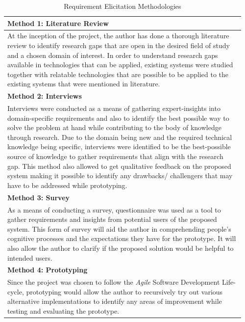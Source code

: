\begin{longtable}{|p{0.96\linewidth}|}
\caption{Requirement Elicitation Methodologies}\\
\hline
\textbf{Method 1: Literature Review} \\
\hline
At the inception of the project, the author has done a thorough literature review to identify research gaps that are open in the desired field of study and a chosen domain of interest. In order to understand research gaps available in technologies that can be applied, existing systems were studied together with relatable technologies that are possible to be applied to the existing systems that were mentioned in literature. \\
\hline
\textbf{Method 2: Interviews} \\
\hline
Interviews were conducted as a means of gathering expert-insights into domain-specific requirements and also to identify the best possible way to solve the problem at hand while contributing to the body of knowledge through research. 
Due to the domain being new and the required technical knowledge being specific, interviews were identified to be the best-possible source of knowledge to gather requirements that align with the research gap. This method also allowed to get qualitative feedback on the proposed system making it possible to identify any drawbacks/ challengers that may have to be addressed while prototyping.
\\
\hline
\textbf{Method 3: Survey} \\
\hline
As a means of conducting a survey, questionnaire was used as a tool to gather requirements and insights from potential users of the proposed system. This form of survey will aid the author in comprehending people's cognitive processes and the expectations they have for the prototype. It will also allow the author to clarify if the proposed solution would be helpful to intended users.\\
\hline
\textbf{Method 4: Prototyping} \\
\hline
Since the project was chosen to follow the \textit{Agile} Software Development Life-cycle, prototyping would allow the author to recursively try out various alternative implementations to identify any areas of improvement while testing and evaluating the prototype.\\
\hline
\end{longtable}

